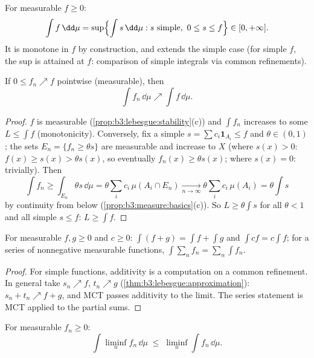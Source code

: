 \begin{definition}\label{def:b3:lebesgue:integral}
For measurable $f \geq 0$:
\[
\int f \,\dd\mu = \sup\Bigl\{\int s\,\dd\mu : s \text{ simple},
\ 0 \leq s \leq f\Bigr\} \in [0, +\infty].
\]
It is monotone in $f$ by construction, and extends the simple
case (for simple $f$, the sup is attained at $f$: comparison of
simple integrals via common refinements).
\end{definition}

\begin{theorem}
\label{thm:b3:lebesgue:mct}
If $0 \leq f_n \nearrow f$ pointwise (measurable), then
\[
\int f_n\,\dd\mu \nearrow \int f\,\dd\mu .
\]
\end{theorem}

\begin{proof}
$f$ is measurable (\cref{prop:b3:lebesgue:stability}(c)) and
$\int f_n$ increases to some $L \leq \int f$ (monotonicity).
Conversely, fix a simple $s = \sum c_i\mathbf 1_{A_i} \leq f$
and $\theta \in (0,1)$; the sets $E_n = \{f_n \geq \theta s\}$
are measurable and increase to $X$ (where $s(x) > 0$: $f(x)
\geq s(x) > \theta s(x)$, so eventually $f_n(x) \geq \theta
s(x)$; where $s(x) = 0$: trivially). Then
\[
\int f_n \geq \int_{E_n}\theta s\,\dd\mu
= \theta\sum_i c_i\,\mu(A_i \cap E_n)
\xrightarrow[n\to\infty]{} \theta\sum_ic_i\,\mu(A_i)
= \theta\int s
\]
by continuity from below (\cref{prop:b3:measure:basics}(c)).
So $L \geq \theta\int s$ for all $\theta < 1$ and all simple $s
\leq f$: $L \geq \int f$.
\end{proof}

\begin{corollary}\label{cor:b3:lebesgue:additivity}
For measurable $f, g \geq 0$ and $c \geq 0$: $\int(f + g) =
\int f + \int g$ and $\int cf = c\int f$; for a series of
nonnegative measurable functions, $\int\sum_nf_n =
\sum_n\int f_n$.
\end{corollary}

\begin{proof}
For simple functions, additivity is a computation on a common
refinement. In general take $s_n \nearrow f$, $t_n \nearrow g$
(\cref{thm:b3:lebesgue:approximation}): $s_n + t_n \nearrow f +
g$, and MCT passes additivity to the limit. The series
statement is MCT applied to the partial sums.
\end{proof}

\begin{theorem}\label{thm:b3:lebesgue:fatou}
For measurable $f_n \geq 0$:
\[
\int \liminf_n f_n \,\dd\mu \;\leq\; \liminf_n \int
f_n\,\dd\mu .
\]
\end{theorem}

